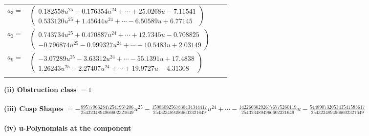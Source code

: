 \documentclass[1p]{elsarticle_modified}
\theoremstyle{definition}
\begin{document}
\begin{tabular}{m{7pt} m{180pt} m{7pt} m{180pt} }
\flushright $a_{3}=$&$\begin{pmatrix}0.182558 u^{25}-0.176354 u^{24}+\cdots+25.0268 u-7.11541\\0.533120 u^{25}+1.45644 u^{24}+\cdots-6.50589 u+6.77145\end{pmatrix}$ \\
\flushright $a_{2}=$&$\begin{pmatrix}0.743734 u^{25}+0.470887 u^{24}+\cdots+12.7345 u-0.708825\\-0.796874 u^{25}-0.999327 u^{24}+\cdots-10.5483 u+2.03149\end{pmatrix}$ \\
\flushright $a_{9}=$&$\begin{pmatrix}-3.07289 u^{25}-3.63312 u^{24}+\cdots-55.1391 u+17.4838\\1.26243 u^{25}+2.27407 u^{24}+\cdots+19.9727 u-4.31308\end{pmatrix}$\\&\end{tabular}
\flushleft \textbf{(ii) Obstruction class $= 1$}\\~\\
\flushleft \textbf{(iii) Cusp Shapes $= -\frac{8957706328472547967206}{2543234894966602321649} u^{25}-\frac{15083092567838434344417}{2543234894966602321649} u^{24}+\cdots-\frac{142260302926776775260119}{2543234894966602321649} u-\frac{54489073205343541583617}{2543234894966602321649}$}\\~\\
\newpage\renewcommand{\arraystretch}{1}
\flushleft \textbf{(iv) u-Polynomials at the component}\newline \\
\end{document}
